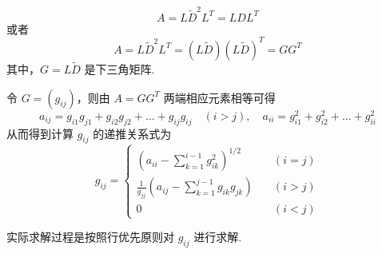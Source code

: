             \begin{equation*}
                A = L\widetilde{D}^2L^T = LDL^T 
            \end{equation*}
            或者
            \begin{equation*}
                A = L\widetilde{D}^2L^T = (L\widetilde{D})(L\widetilde{D})^T = GG^T
            \end{equation*}
            其中，$G = L\widetilde{D}$ 是下三角矩阵.
            \par 令 $G = (g_{ij})$，则由 $A = GG^T$ 两端相应元素相等可得
            \begin{equation*}
                a_{ij} = g_{i1}g_{j1} + g_{i2}g_{j2} + \dots + g_{ij}g_{ij} \quad (i > j), \quad a_{ii} = g_{i1}^2 + g_{i2}^2 + \dots + g_{ii}^2
            \end{equation*}
            从而得到计算 $g_{ij}$ 的递推关系式为
            \begin{equation*}
                g_{ij} = \begin{cases*}
                    (a_{ii} - \sum_{k=1}^{i-1}g_{ik}^2)^{1/2} \quad &(i = j) \\
                    \frac{1}{g_{jj}}(a_{ij} - \sum_{k=1}^{j-1}g_{ik}g_{jk}) \quad &(i > j) \\
                    0 \quad &(i < j)
                \end{cases*}
            \end{equation*}
            \par 实际求解过程是按照行优先原则对 $g_{ij}$ 进行求解.

